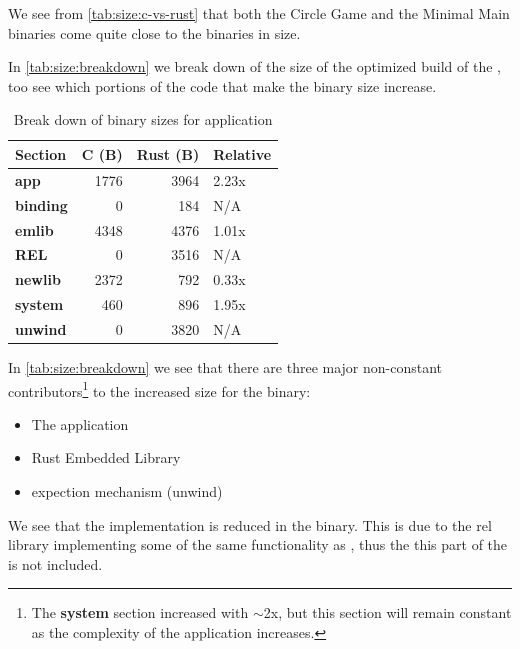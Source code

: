 We see from \autoref{tab:size:c-vs-rust} that both the Circle Game and the Minimal Main  {\rust} binaries come quite close to the {\C} binaries in size.

In \autoref{tab:size:breakdown} we break down of the size of the optimized build of the {\tracker}, too see which portions of the {\rust} code that make the binary size increase.

\begin{table}[H]
  \centering
  \begin{tabular}{l|r|r|l}
    \textbf{Section}      & \textbf{C (B)} & \textbf{Rust (B)} & \textbf{Relative} \\
    \hline
    \textbf{app}          & 1776 & 3964 & 2.23x \\
    \textbf{binding}      & 0    & 184  & N/A  \\
    \textbf{emlib}        & 4348 & 4376 & 1.01x \\
    \textbf{REL}          & 0    & 3516 & N/A  \\
    \textbf{newlib}       & 2372 & 792  & 0.33x \\
    \textbf{system}       & 460  & 896  & 1.95x \\
    \textbf{unwind}       & 0    & 3820 & N/A  \\
    \hline
  \end{tabular}
  \caption{Break down of binary sizes for {\tracker} application}
  \label{tab:size:breakdown}
\end{table}

In \autoref{tab:size:breakdown} we see that there are three major non-constant contributors\footnote{The \textbf{system} section increased with $\sim$2x, but this section will remain constant as the complexity of the application increases.} to the increased size for the {\rust} binary:

\begin{itemize}
\item The application
\item Rust Embedded Library
\item {\rust} expection mechanism (unwind)
\end{itemize}

We see that the  implementation is reduced in the {\rust} binary.
This is due to the \gls{rel} library implementing some of the same functionality as , thus the this part of the  is not included.


